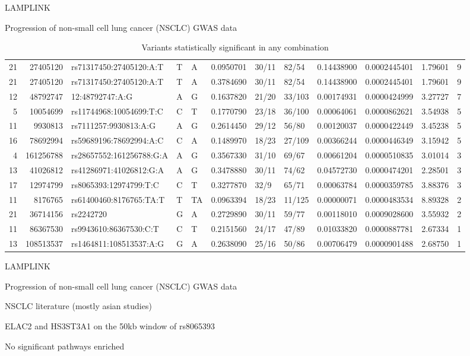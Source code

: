 \documentclass[ignorenonframetext,]{beamer}
\begin{document}
\begin{frame}{LAMPLINK}
\begin{block}{Progression of non-small cell lung cancer (NSCLC) GWAS
data}
\begin{table}[ht]
{\begin{tabular}{rrlllrllrrrr}
  21 & 27405120 & rs71317450:27405120:A:T & T & A & 0.0950701 & 30/11 & 82/54 & 0.14438900 & 0.0002445401 & 1.79601 & 9 \\ 
  21 & 27405120 & rs71317450:27405120:A:T & T & A & 0.3784690 & 30/11 & 82/54 & 0.14438900 & 0.0002445401 & 1.79601 & 9 \\ 
  12 & 48792747 & 12:48792747:A:G & A & G & 0.1637820 & 21/20 & 33/103 & 0.00174931 & 0.0000424999 & 3.27727 & 7 \\ 
  5 & 10054699 & rs11744968:10054699:T:C & C & T & 0.1770790 & 23/18 & 36/100 & 0.00064061 & 0.0000862621 & 3.54938 & 5 \\ 
  11 & 9930813 & rs7111257:9930813:A:G & A & G & 0.2614450 & 29/12 & 56/80 & 0.00120037 & 0.0000422449 & 3.45238 & 5 \\ 
  16 & 78692994 & rs59689196:78692994:A:C & C & A & 0.1489970 & 18/23 & 27/109 & 0.00366244 & 0.0000446349 & 3.15942 & 5 \\ 
  4 & 161256788 & rs28657552:161256788:G:A & A & G & 0.3567330 & 31/10 & 69/67 & 0.00661204 & 0.0000510835 & 3.01014 & 3 \\ 
  13 & 41026812 & rs41286971:41026812:G:A & A & G & 0.3478880 & 30/11 & 74/62 & 0.04572730 & 0.0000474201 & 2.28501 & 3 \\ 
  17 & 12974799 & rs8065393:12974799:T:C & C & T & 0.3277870 & 32/9 & 65/71 & 0.00063784 & 0.0000359785 & 3.88376 & 3 \\ 
  11 & 8176765 & rs61400460:8176765:TA:T & T & TA & 0.0963394 & 18/23 & 11/125 & 0.00000071 & 0.0000483534 & 8.89328 & 2 \\ 
  21 & 36714156 & rs2242720 & G & A & 0.2729890 & 30/11 & 59/77 & 0.00118010 & 0.0009028600 & 3.55932 & 2 \\ 
  11 & 86367530 & rs9943610:86367530:C:T & C & T & 0.2151560 & 24/17 & 47/89 & 0.01033820 & 0.0000887781 & 2.67334 & 1 \\ 
  13 & 108513537 & rs1464811:108513537:A:G & G & A & 0.2638090 & 25/16 & 50/86 & 0.00706479 & 0.0000901488 & 2.68750 & 1 \\ 
   \hline
\end{tabular}
}
\caption{Variants statistically significant in any combination} 
\end{table}

\end{block}

\end{frame}

\begin{frame}{LAMPLINK}

\begin{block}{Progression of non-small cell lung cancer (NSCLC) GWAS
data}

NSCLC literature (mostly asian studies)

ELAC2 and HS3ST3A1 on the 50kb window of rs8065393

No significant pathways enriched

\end{block}

\end{frame}
\end{document}
